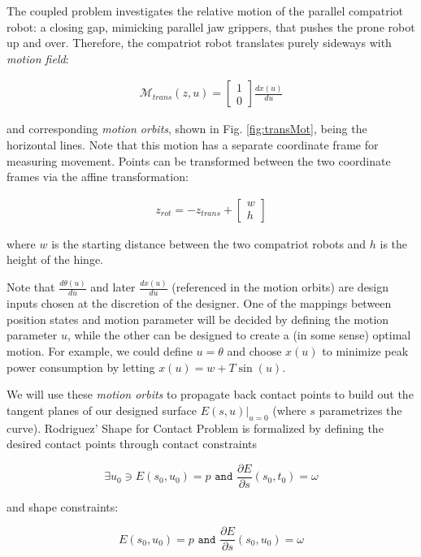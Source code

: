 \documentclass[letterpaper, 10 pt, conference]{ieeeconf}
\begin{document}
The coupled problem investigates the relative motion of the parallel compatriot robot: a closing gap, mimicking parallel jaw grippers, that pushes the prone robot up and over.
Therefore, the compatriot robot translates purely sideways with \textit{motion field}:

\begin{align}
\mathcal{M}_{trans}(z,u) = \begin{bmatrix} 1 \\ 0 \end{bmatrix} \frac{dx(u)}{du}
\end{align}

and corresponding \textit{motion orbits}, shown in Fig. \ref{fig:transMot}, being the horizontal lines.
Note that this motion has a separate coordinate frame for measuring movement.
Points can be transformed between the two coordinate frames via the affine transformation:

\begin{align}
 z_{rot}=-z_{trans}+\begin{bmatrix}w \\ h\end{bmatrix}
\end{align}

where $w$ is the starting distance between the two compatriot robots and $h$ is the height of the hinge.

Note that $\frac{d\theta(u)}{du}$ and later $\frac{dx(u)}{du}$ (referenced in the motion orbits) are design inputs chosen at the discretion of the designer.
One of the mappings between position states and motion parameter will be decided by defining the motion parameter $u$, while the other can be designed to create a (in some sense) optimal motion.
For example, we could define $u=\theta$ and choose $x(u)$ to minimize peak power consumption by letting $x(u) = w + T \sin(u)$.

We will use these \textit{motion orbits} to propagate back contact points to build out the tangent planes of our designed surface $E(s,u)\rvert_{u=0}$ (where $s$ parametrizes the curve).
Rodriguez' Shape for Contact Problem is formalized by defining the desired contact points through contact constraints

$$\exists u_0 \ni E(s_0,u_0) = p \texttt{ and } \frac{\partial E}{\partial s}(s_0,t_0) = \omega$$

and shape constraints:

$$E(s_0,u_0) = p \texttt{ and } \frac{\partial E}{\partial s}(s_0,u_0) = \omega$$
\end{document}
